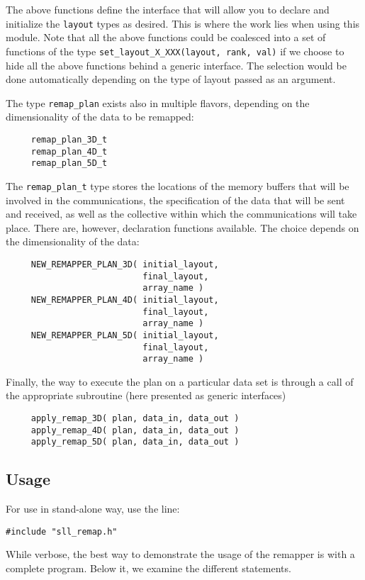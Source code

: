 \documentclass[]{report}   %
\begin{document}
The above functions define the interface that will allow you to declare and initialize the \verb+layout+ types as desired. This is where the work lies when using this module. Note that all the above functions could be coalesced into a set of functions of the type \verb+set_layout_X_XXX(layout, rank, val)+ if we choose to hide all the above functions behind a generic interface. The selection would be done automatically depending on the type of layout passed as an argument. 

The type \verb+remap_plan+ exists also in multiple flavors, depending on the dimensionality of the data to be remapped:

\begin{verbatim}
     remap_plan_3D_t
     remap_plan_4D_t
     remap_plan_5D_t
\end{verbatim}

The \verb+remap_plan_t+ type stores the locations of the memory buffers that will be involved in the communications, the specification of the data that will be sent and received, as well as the collective within which the communications will take place. There are, however, declaration functions available. The choice depends on the dimensionality of the data:

\begin{verbatim}
     NEW_REMAPPER_PLAN_3D( initial_layout, 
                           final_layout, 
                           array_name )
     NEW_REMAPPER_PLAN_4D( initial_layout, 
                           final_layout, 
                           array_name )
     NEW_REMAPPER_PLAN_5D( initial_layout, 
                           final_layout, 
                           array_name )
\end{verbatim}

Finally, the way to execute the plan on a particular data set is through a call of the appropriate subroutine (here presented as generic interfaces)

\begin{verbatim}
     apply_remap_3D( plan, data_in, data_out )
     apply_remap_4D( plan, data_in, data_out )
     apply_remap_5D( plan, data_in, data_out )
\end{verbatim}

\subsection{Usage}
For use in stand-alone way, use the line:
\begin{verbatim}
#include "sll_remap.h"
\end{verbatim}
While verbose, the best way to demonstrate the usage of the remapper is with a complete program. Below it, we examine the different statements.
\end{document}
